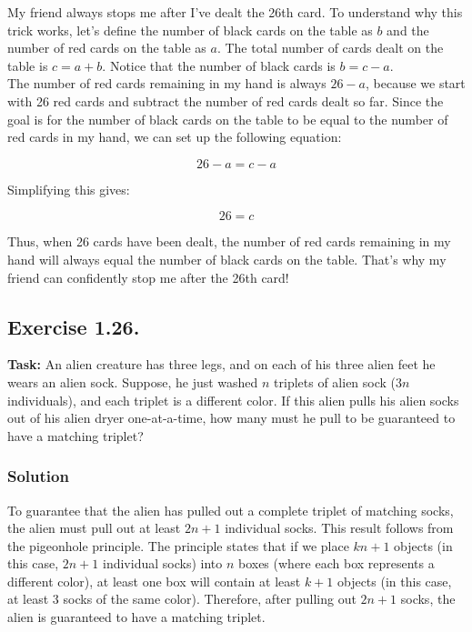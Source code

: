 \documentclass{article}
\begin{document}
My friend always stops me after I’ve dealt the 26th card. To understand why this trick works, let’s define the number of black cards on the table as \(b\) and the number of red cards on the table as \(a\). The total number of cards dealt on the table is \(c = a + b\). Notice that the number of black cards is \(b = c - a\).\\
The number of red cards remaining in my hand is always \(26 - a\), because we start with 26 red cards and subtract the number of red cards dealt so far. Since the goal is for the number of black cards on the table to be equal to the number of red cards in my hand, we can set up the following equation:

\[
26 - a = c - a
\]

Simplifying this gives:

\[
26 = c
\]

Thus, when 26 cards have been dealt, the number of red cards remaining in my hand will always equal the number of black cards on the table. That’s why my friend can confidently stop me after the 26th card!

\newpage

\subsection{Exercise 1.26.} 
\textbf{Task:} An alien creature has three legs, and on each of his three alien feet he wears an alien sock. Suppose, he just washed $n$ triplets of alien sock ($3n$ individuals), and each triplet is a different color. If this alien pulls his alien socks out of his alien dryer one-at-a-time, how many must he pull to be guaranteed to have a matching triplet?

\subsubsection*{Solution}

To guarantee that the alien has pulled out a complete triplet of matching socks, the alien must pull out at least \(2n+1\) individual socks. This result follows from the pigeonhole principle. The principle states that if we place \(kn+1\) objects (in this case, \(2n+1\) individual socks) into \(n\) boxes (where each box represents a different color), at least one box will contain at least \(k+1\) objects (in this case, at least 3 socks of the same color). Therefore, after pulling out \(2n+1\) socks, the alien is guaranteed to have a matching triplet.
\end{document}
